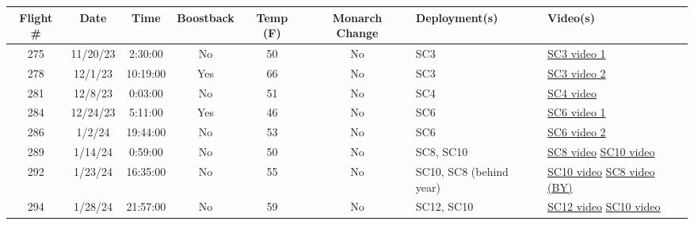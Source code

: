 \begin{longtable}{|c|c|c|c|c|c|p{2.5cm}|p{5cm}|}
\hline
\textbf{Flight \#} & \textbf{Date} & \textbf{Time} & \textbf{Boostback} & \textbf{Temp (F)} & \textbf{Monarch Change} & \textbf{Deployment(s)} & \textbf{Video(s)} \\
\hline
275 & 11/20/23 & 2:30:00 & No & 50 & No & SC3 & \href{https://youtu.be/EjNyWgDMnaA?si=tF78Lck0BBfF1kzb\&t=21}{SC3 video 1} \\
\hline
278 & 12/1/23 & 10:19:00 & Yes & 66 & No & SC3 & \href{https://youtu.be/EjNyWgDMnaA?si=sDoxxwUsjJZVCXST\&t=561}{SC3 video 2} \\
\hline
281 & 12/8/23 & 0:03:00 & No & 51 & No & SC4 & \href{https://youtu.be/RW91J3HMm_4?si=LM_TRjQAb_pA5lFN\&t=104}{SC4 video} \\
\hline
284 & 12/24/23 & 5:11:00 & Yes & 46 & No & SC6 & \href{https://youtu.be/MqmH5L3lXbk?si=6g8voV1f43D4lI5Y\&t=207}{SC6 video 1} \\
\hline
286 & 1/2/24 & 19:44:00 & No & 53 & No & SC6 & \href{https://youtu.be/MqmH5L3lXbk?si=aT3sviJN7YJ9i5bv\&t=437}{SC6 video 2} \\
\hline
289 & 1/14/24 & 0:59:00 & No & 50 & No & SC8, SC10 & \href{https://youtu.be/AOWrySdh1z8?si=Pak3IK64mY7OlAMI\&t=200}{SC8 video} \newline \href{https://youtu.be/0zLjm9PA6YM?si=Bokwr4KQj_jWIxWe\&t=224}{SC10 video} \\
\hline
292 & 1/23/24 & 16:35:00 & No & 55 & No & SC10, SC8 (behind year) & \href{https://youtu.be/0zLjm9PA6YM?si=Ve9XAPoi9p32KaN0\&t=431}{SC10 video} \newline \href{https://youtu.be/AOWrySdh1z8?si=744XzLu4L5U3Pjx7\&t=431}{SC8 video (BY)} \\
\hline
294 & 1/28/24 & 21:57:00 & No & 59 & No & SC12, SC10 & \href{https://youtu.be/4uLZIZqlgPE?si=jwAqUIh4ifB_exz-\&t=32}{SC12 video} \newline \href{https://youtu.be/0zLjm9PA6YM?si=JJND2CcZOMcbKwkF\&t=552}{SC10 video} \\
\hline
\end{longtable}